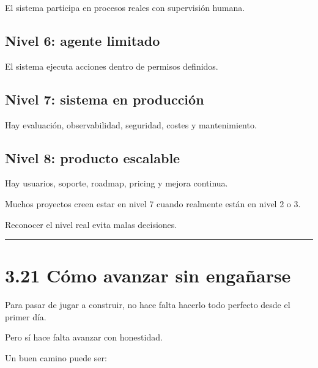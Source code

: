 El sistema participa en procesos reales con supervisión humana.

\subsection{Nivel 6: agente limitado}\label{nivel-6-agente-limitado}

El sistema ejecuta acciones dentro de permisos definidos.

\subsection{Nivel 7: sistema en
producción}\label{nivel-7-sistema-en-producciuxf3n}

Hay evaluación, observabilidad, seguridad, costes y mantenimiento.

\subsection{Nivel 8: producto
escalable}\label{nivel-8-producto-escalable}

Hay usuarios, soporte, roadmap, pricing y mejora continua.

Muchos proyectos creen estar en nivel 7 cuando realmente están en nivel
2 o 3.

Reconocer el nivel real evita malas decisiones.

\begin{center}\rule{0.5\linewidth}{0.5pt}\end{center}

\section{3.21 Cómo avanzar sin
engañarse}\label{cuxf3mo-avanzar-sin-engauxf1arse}

Para pasar de jugar a construir, no hace falta hacerlo todo perfecto
desde el primer día.

Pero sí hace falta avanzar con honestidad.

Un buen camino puede ser:

